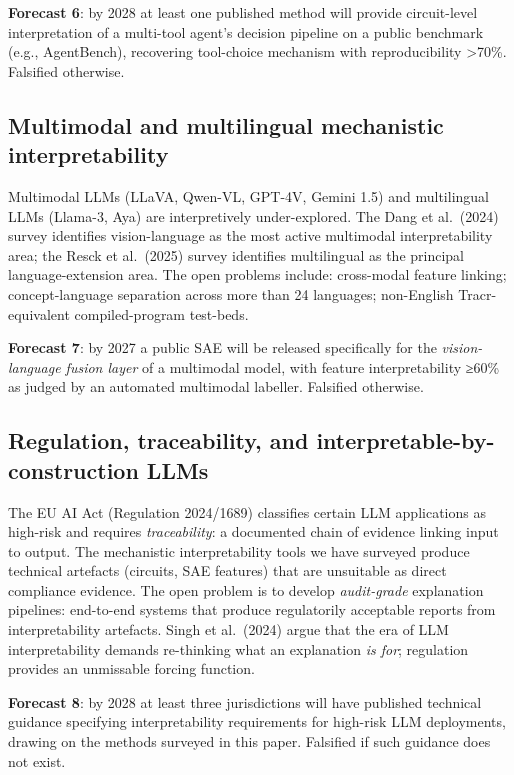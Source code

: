 \documentclass{article}
\begin{document}
\textbf{Forecast 6}: by 2028 at least one published method will provide circuit-level interpretation of a multi-tool agent's decision pipeline on a public benchmark (e.g., AgentBench), recovering tool-choice mechanism with reproducibility \textgreater70\%. Falsified otherwise.

\subsection{Multimodal and multilingual mechanistic interpretability}\label{multimodal-and-multilingual-mechanistic-interpretability}

Multimodal LLMs (LLaVA, Qwen-VL, GPT-4V, Gemini 1.5) and multilingual LLMs (Llama-3, Aya) are interpretively under-explored. The Dang et al.~(2024) survey identifies vision-language as the most active multimodal interpretability area; the Resck et al.~(2025) survey identifies multilingual as the principal language-extension area. The open problems include: cross-modal feature linking; concept-language separation across more than 24 languages; non-English Tracr-equivalent compiled-program test-beds.

\textbf{Forecast 7}: by 2027 a public SAE will be released specifically for the \emph{vision-language fusion layer} of a multimodal model, with feature interpretability ≥60\% as judged by an automated multimodal labeller. Falsified otherwise.

\subsection{Regulation, traceability, and interpretable-by-construction LLMs}\label{regulation-traceability-and-interpretable-by-construction-llms}

The EU AI Act (Regulation 2024/1689) classifies certain LLM applications as high-risk and requires \emph{traceability}: a documented chain of evidence linking input to output. The mechanistic interpretability tools we have surveyed produce technical artefacts (circuits, SAE features) that are unsuitable as direct compliance evidence. The open problem is to develop \emph{audit-grade} explanation pipelines: end-to-end systems that produce regulatorily acceptable reports from interpretability artefacts. Singh et al.~(2024) argue that the era of LLM interpretability demands re-thinking what an explanation \emph{is for}; regulation provides an unmissable forcing function.

\textbf{Forecast 8}: by 2028 at least three jurisdictions will have published technical guidance specifying interpretability requirements for high-risk LLM deployments, drawing on the methods surveyed in this paper. Falsified if such guidance does not exist.
\end{document}
